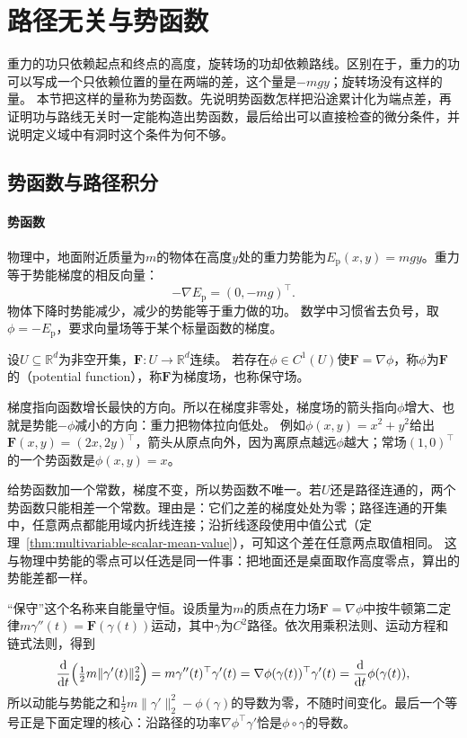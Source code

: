 \section{路径无关与势函数}
\label{sec:multivariable-potential-path-independence}

重力的功只依赖起点和终点的高度，旋转场的功却依赖路线。区别在于，重力的功可以写成一个只依赖位置的量在两端的差，这个量是$-mgy$；旋转场没有这样的量。
本节把这样的量称为势函数。先说明势函数怎样把沿途累计化为端点差，再证明功与路线无关时一定能构造出势函数，最后给出可以直接检查的微分条件，并说明定义域中有洞时这个条件为何不够。

\subsection{势函数与路径积分}

\paragraph{势函数}

物理中，地面附近质量为$m$的物体在高度$y$处的重力势能为$E_{\mathrm p}(x,y)=mgy$。重力等于势能梯度的相反向量：
\[
 -\nabla E_{\mathrm p}=(0,-mg)^\top .
\]
物体下降时势能减少，减少的势能等于重力做的功。
数学中习惯省去负号，取$\phi=-E_{\mathrm p}$，要求向量场等于某个标量函数的梯度。
\begin{definition}[势函数]
设$U\subseteq\mathbb R^d$为非空开集，$\bm F:U\to\mathbb R^d$连续。
若存在$\phi\in C^1(U)$使$\bm F=\nabla\phi$，称$\phi$为$\bm F$的（potential function），称$\bm F$为梯度场，也称保守场。
\end{definition}

梯度指向函数增长最快的方向。所以在梯度非零处，梯度场的箭头指向$\phi$增大、也就是势能$-\phi$减小的方向：重力把物体拉向低处。
例如$\phi(x,y)=x^2+y^2$给出$\bm F(x,y)=(2x,2y)^\top$，箭头从原点向外，因为离原点越远$\phi$越大；常场$(1,0)^\top$的一个势函数是$\phi(x,y)=x$。

给势函数加一个常数，梯度不变，所以势函数不唯一。若$U$还是路径连通的，两个势函数只能相差一个常数。理由是：它们之差的梯度处处为零；路径连通的开集中，任意两点都能用域内折线连接；沿折线逐段使用中值公式（定理~\ref{thm:multivariable-scalar-mean-value}），可知这个差在任意两点取值相同。
这与物理中势能的零点可以任选是同一件事：把地面还是桌面取作高度零点，算出的势能差都一样。

“保守”这个名称来自能量守恒。设质量为$m$的质点在力场$\bm F=\nabla\phi$中按牛顿第二定律$m\gamma''(t)=\bm F(\gamma(t))$运动，其中$\gamma$为$C^2$路径。依次用乘积法则、运动方程和链式法则，得到
\[
 \frac{\mathrm d}{\mathrm dt}\Bigl(\tfrac12m\lVert\gamma'(t)\rVert_2^2\Bigr)
 =m\gamma''(t)^\top\gamma'(t)=\nabla\phi(\gamma(t))^\top\gamma'(t)
 =\frac{\mathrm d}{\mathrm dt}\phi(\gamma(t)),
\]
所以动能与势能之和$\frac12m\lVert\gamma'\rVert_2^2-\phi(\gamma)$的导数为零，不随时间变化。最后一个等号正是下面定理的核心：沿路径的功率$\nabla\phi^\top\gamma'$恰是$\phi\circ\gamma$的导数。


